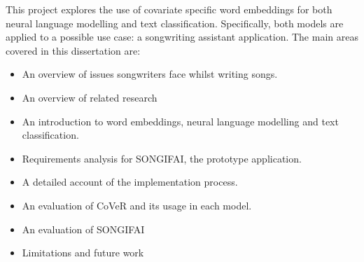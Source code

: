 \documentclass[a4paper,11pt]{report}
\begin{document}
\noindent
\newline
This project explores the use of covariate specific word embeddings for both neural language modelling and text classification. Specifically, both models are applied to a possible use case: a songwriting assistant application. The main areas covered in this dissertation are:
\begin{itemize}
	\item An overview of issues songwriters face whilst writing songs.
	\item An overview of related research 
	\item An introduction to word embeddings, neural language modelling and text classification.
	\item Requirements analysis for SONGIFAI, the prototype application.
	\item A detailed account of the implementation process.
	\item An evaluation of CoVeR and its usage in each model.
	\item An evaluation of SONGIFAI
	\item Limitations and future work
	
\end{itemize}

\newpage
{}
\tableofcontents
\listoftables
{}
{}
\listoffigures
{}
{}


\newpage
{}


 
 
 
 
 
 
 
 
 
\end{document}
